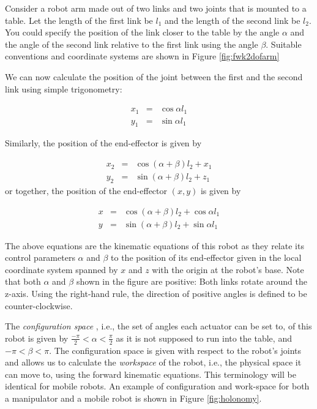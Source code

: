 Consider a robot arm made out of two links and two joints that is mounted to a table. Let the length of the first link be $l_1$ and the length of the second link be $ l_2$. You could specify the position of the link closer to the table by the angle $ \alpha$ and the angle of the second link relative to the first link using the angle $ \beta$. Suitable conventions and coordinate systems are shown in Figure \ref{fig:fwk2dofarm}

We can now calculate the position of the joint between the first and the second link using simple trigonometry:

\begin{eqnarray}\label{eq:cosxl1}
x_1 &=&\cos \alpha l_1\\
y_1 &=&\sin \alpha l_1
\end{eqnarray}

Similarly, the position of the end-effector is given by

\begin{eqnarray}
x_2&=&\cos(\alpha+\beta)l_2+x_1\\
y_2&=&\sin(\alpha+\beta)l_2+z_1
\end{eqnarray}
%
or together, the position of the end-effector $(x,y)$ is given by

\begin{eqnarray}\label{eq:cosx}
x&=&\cos(\alpha+\beta)l_2+\cos\alpha l_1\\
y&=&\sin(\alpha+\beta)l_2+\sin\alpha l_1
\end{eqnarray}

The above equations are the kinematic equations of this robot as they relate its control parameters $ \alpha$ and $\beta$ to the position of its end-effector given in the local coordinate system spanned by $ x$ and $ z$ with the origin at the robot's base. Note that both $\alpha$ and $\beta$ shown in the figure are positive: Both links rotate around the z-axis. Using the right-hand rule, the direction of positive angles is defined to be counter-clockwise. 

The \emph{configuration space} , i.e., the set of angles each actuator can be set to, of this robot is given by $ \frac{-\pi}{2}<\alpha<\frac{\pi}{2}$ as it is not supposed to run into the table, and $ -\pi < \beta < \pi$. The configuration space is given with respect to the robot's joints and allows us to calculate the \emph{workspace} of the robot, i.e., the physical space it can move to, using the forward kinematic equations. This terminology will be identical for mobile robots. An example of configuration and work-space for both a manipulator and a mobile robot is shown in Figure \ref{fig:holonomy}.

